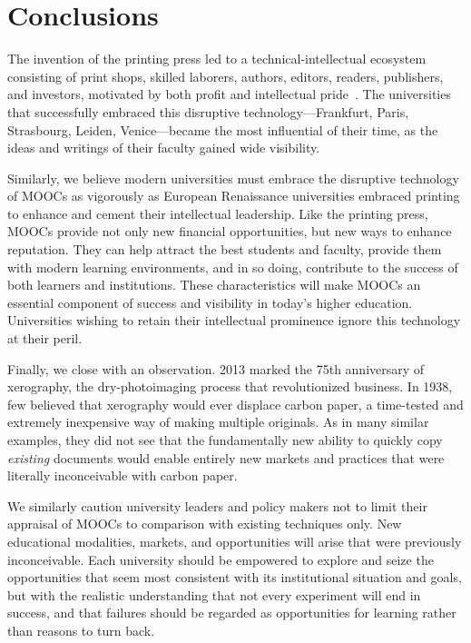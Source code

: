 \section{Conclusions}

The invention of the printing press led to a technical-intellectual ecosystem consisting of print
shops, skilled laborers, authors, editors, readers, publishers, and investors, motivated by both
profit and intellectual pride~\cite{febvre}.  The universities that successfully embraced this
disruptive technology---Frankfurt, Paris, Strasbourg, Leiden, Venice---became the most influential
of their time, as the ideas and writings of their faculty gained wide visibility.

Similarly, we believe modern universities must embrace the disruptive technology of MOOCs as
vigorously as European Renaissance universities embraced printing to enhance and cement their
intellectual leadership.  Like the printing press, MOOCs provide not only new financial
opportunities,
but new ways to enhance reputation.  They can help attract the best students and faculty, provide
them with modern learning environments, and in so doing, contribute to the success of both learners
and institutions.  These characteristics will make MOOCs an essential component of success and
visibility in today's higher education.  Universities wishing to retain their intellectual
prominence ignore this technology at their peril.

Finally, we close with an observation.  2013 marked the 75th anniversary of xerography, the
dry-photoimaging process that revolutionized business. In 1938, few believed that xerography would
ever displace carbon paper, a time-tested and extremely inexpensive way of making multiple
originals.  As in many similar examples, they did not see that the fundamentally new ability to
quickly copy \emph{existing} documents would enable entirely new markets and practices that were
literally inconceivable with carbon paper.

We similarly caution university leaders and policy makers not to limit their appraisal of MOOCs to
comparison with existing techniques only.  New educational modalities, markets, and opportunities
will arise that were previously inconceivable.  Each university should be empowered to explore and
seize the opportunities that seem most consistent with its institutional situation and goals, but
with the realistic understanding that not every experiment will end in success, and that failures
should be regarded as opportunities for learning rather than reasons to turn back.


